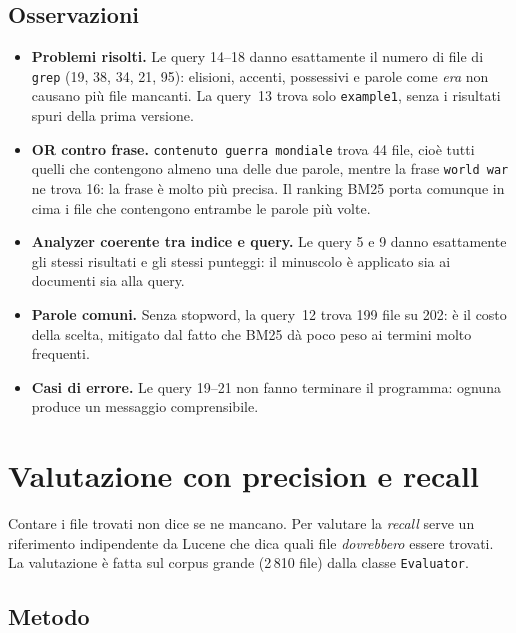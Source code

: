 \documentclass[11pt,a4paper]{article}
\newcommand{\dq}{\textquotedbl}            %
\newcommand{\code}[1]{\texttt{#1}}
\begin{document}
\subsection{Osservazioni}

\begin{itemize}
  \item \textbf{Problemi risolti.} Le query 14--18 danno esattamente il numero di
        file di \code{grep} (19, 38, 34, 21, 95): elisioni, accenti, possessivi e
        parole come \emph{era} non causano più file mancanti. La query~13 trova solo
        \code{example1}, senza i risultati spuri della prima versione.
  \item \textbf{OR contro frase.} \code{contenuto guerra mondiale} trova 44 file,
        cioè tutti quelli che contengono almeno una delle due parole, mentre la
        frase \code{\dq{}world war\dq} ne trova 16: la frase è molto più precisa.
        Il ranking BM25 porta comunque in cima i file che contengono entrambe le
        parole più volte.
  \item \textbf{Analyzer coerente tra indice e query.} Le query 5 e 9 danno
        esattamente gli stessi risultati e gli stessi punteggi: il minuscolo è
        applicato sia ai documenti sia alla query.
  \item \textbf{Parole comuni.} Senza stopword, la query~12 trova 199 file su 202:
        è il costo della scelta, mitigato dal fatto che BM25 dà poco peso ai termini
        molto frequenti.
  \item \textbf{Casi di errore.} Le query 19--21 non fanno terminare il
        programma: ognuna produce un messaggio comprensibile.
\end{itemize}

\section{Valutazione con precision e recall}
\label{sec:valutazione}

Contare i file trovati non dice se ne mancano. Per valutare la \emph{recall} serve un
riferimento indipendente da Lucene che dica quali file \emph{dovrebbero} essere
trovati. La valutazione è fatta sul corpus grande (2\,810 file) dalla classe
\code{Evaluator}.

\subsection{Metodo}
\end{document}
